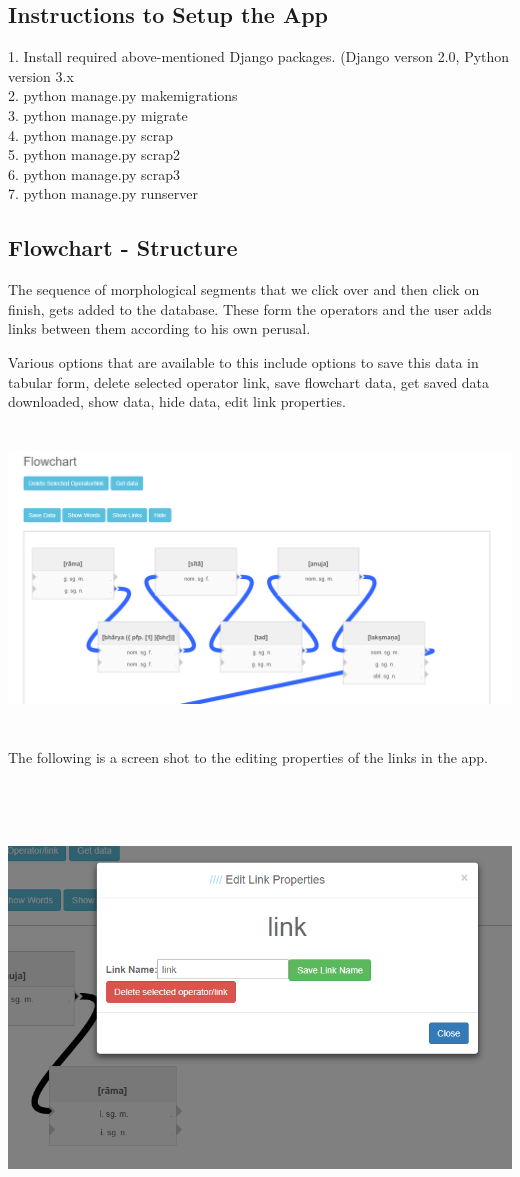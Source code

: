 \documentclass[12pt]{article}
\begin{document}
\subsection{Instructions to Setup the App}
1. Install required above-mentioned Django packages. (Django verson 2.0, Python version 3.x \\ 
2. python manage.py makemigrations \\ 
3. python manage.py migrate \\
4. python manage.py scrap \\
5. python manage.py scrap2 \\
6. python manage.py scrap3 \\
7. python manage.py runserver

\subsection{Flowchart - Structure}
The sequence of morphological segments that we click over and then click on finish, gets added to the database. These form the operators and the user adds links between them according to his own perusal. 

Various options that are available to this include options to save this data in tabular form, delete selected operator link, save flowchart data, get saved data downloaded, show data, hide data, edit link properties. 
\\ \\ \\
\includegraphics[width=150mm,scale=20]{capture1}
\\ \\ \\
The following is a screen shot to the editing properties of the links in the app.\\ \\ 

\\ \\ \\
\includegraphics[width=150mm,scale=20]{capture4}
\end{document}
